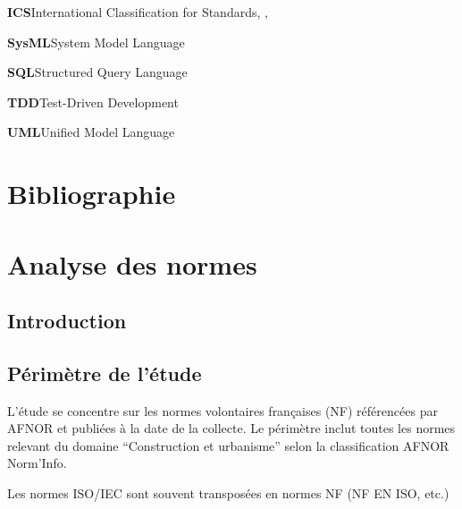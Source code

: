 \documentclass[a4paper,12pt]{article}
\begin{document}
\textbf{\hypertarget{gls-179}{ICS}}\hspace*{1em}International Classification for Standards\hspace*{.5em}\pageref{gls-10-use-1}, \pageref{gls-10-use-2}, \pageref{gls-10-use-3}

\textbf{\hypertarget{gls-318}{SysML}}\hspace*{1em}System Model Language\hspace*{.5em}\pageref{gls-9-use-1}

\textbf{\hypertarget{gls-310}{SQL}}\hspace*{1em}Structured Query Language\hspace*{.5em}\pageref{gls-2-use-1}

\textbf{\hypertarget{gls-320}{TDD}}\hspace*{1em}Test-Driven Development\hspace*{.5em}\pageref{gls-4-use-1}

\textbf{\hypertarget{gls-325}{UML}}\hspace*{1em}Unified Model Language\hspace*{.5em}\pageref{gls-8-use-1}

\clearpage
\section{Bibliographie}
\label{sec:org18fa8ea}
\printbibliography[heading=none]

\clearpage

\appendix
\section{Analyse des normes}
\label{sec:org5656cea}
\subsection{Introduction}
\label{sec:org94c9099}
\subsection{Périmètre de l'étude}
\label{sec:orga4dd353}
L’étude se concentre sur les normes volontaires françaises (NF) référencées par AFNOR et publiées à la date de la collecte.
Le périmètre inclut toutes les normes relevant du domaine “Construction et urbanisme” selon la classification AFNOR Norm’Info.

Les normes ISO/IEC sont souvent transposées en normes NF (NF EN ISO, etc.)
\end{document}
